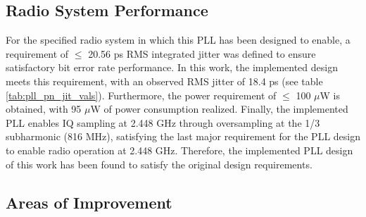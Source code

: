 \subsection{Radio System Performance}
	For the specified radio system in which this PLL has been designed to enable, a requirement of $\leq$ 20.56 ps RMS integrated jitter was defined to ensure satisfactory bit error rate performance. In this work, the implemented design meets this requirement, with an observed RMS jitter of 18.4 ps (see table \ref{tab:pll_pn_jit_vals}). Furthermore, the power requirement of $\leq$ 100 $\mu$W is obtained, with 95 $\mu$W of power consumption realized. Finally, the implemented PLL enables IQ sampling at 2.448 GHz through oversampling at the 1/3 subharmonic (816 MHz), satisfying the last major requirement for the PLL design to enable radio operation at 2.448 GHz. Therefore, the implemented PLL design of this work has been found to satisfy the original design requirements.


\subsection{Areas of Improvement}

